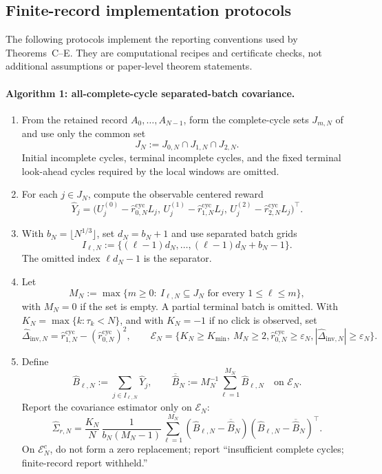 \subsection{Finite-record implementation protocols}\label{app:finite-record-implementation-protocols-main}

The following protocols implement the reporting conventions used by
Theorems~C--E.  They are computational recipes and certificate checks, not
additional assumptions or paper-level theorem statements.

\label{alg:all-complete-cycle-separated-batch-main}
\paragraph{Algorithm 1: all-complete-cycle separated-batch covariance.}

\begin{enumerate}[label=\textup{\arabic*.},leftmargin=2.0em,itemsep=0.35em]
\item From the retained record \(A_0,\ldots,A_{N-1}\), form the complete-cycle
sets \(J_{m,N}\) of
 and use only the common set
\[
J_N:=J_{0,N}\cap J_{1,N}\cap J_{2,N}.
\]
Initial incomplete cycles, terminal incomplete cycles, and the fixed terminal
look-ahead cycles required by the local windows are omitted.

\item For each \(j\in J_N\), compute the observable centered reward
\[
\widehat Y_j=
\bigl(U_j^{(0)}-\widehat r_{0,N}^{\mathrm{cyc}}L_j,\,
U_j^{(1)}-\widehat r_{1,N}^{\mathrm{cyc}}L_j,\,
U_j^{(2)}-\widehat r_{2,N}^{\mathrm{cyc}}L_j\bigr)^\top .
\]

\item With \(b_N=\lfloor N^{1/3}\rfloor\), set \(d_N=b_N+1\) and use separated
batch grids
\[
I_{\ell,N}:=\{(\ell-1)d_N,\ldots,(\ell-1)d_N+b_N-1\}.
\]
The omitted index \(\ell d_N-1\) is the separator.

\item Let
\[
M_N:=\max\{m\ge0:\ I_{\ell,N}\subseteq J_N
\text{ for every }1\le\ell\le m\},
\]
with \(M_N=0\) if the set is empty.  A partial terminal batch is omitted.
With \(K_N=\max\{k:\tau_k<N\}\), and with \(K_N=-1\) if no click is observed,
set
\[
\widehat\Delta_{\mathrm{inv},N}=
\widehat r_{1,N}^{\mathrm{cyc}}-(\widehat r_{0,N}^{\mathrm{cyc}})^2,
\qquad
\mathcal E_N=
\{K_N\ge K_{\min},\ M_N\ge2,
\widehat r_{0,N}^{\mathrm{cyc}}\ge\varepsilon_N,
|\widehat\Delta_{\mathrm{inv},N}|\ge\varepsilon_N\}.
\]

\item Define
\[
\widehat B_{\ell,N}:=\sum_{j\in I_{\ell,N}}\widehat Y_j,\qquad
\overline{\widehat B}_N:=M_N^{-1}\sum_{\ell=1}^{M_N}\widehat B_{\ell,N}
\quad\text{on }\mathcal E_N.
\]
Report the covariance estimator only on \(\mathcal E_N\):
\[
\widehat\Sigma_{r,N}
=
\frac{K_N}{N}\,
\frac1{b_N(M_N-1)}
\sum_{\ell=1}^{M_N}
(\widehat B_{\ell,N}-\overline{\widehat B}_N)
(\widehat B_{\ell,N}-\overline{\widehat B}_N)^\top .
\]
On \(\mathcal E_N^c\), do not form a zero replacement; report
``insufficient complete cycles; finite-record report withheld.''
\end{enumerate}

